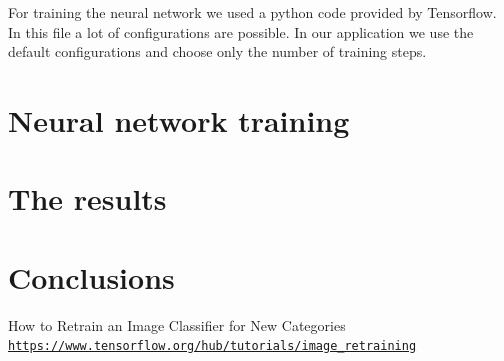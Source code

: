 \documentclass[12pt]{article}
\begin{document}
For training the neural network we used a python code \cite{retrain} provided by
Tensorflow. In this file a lot of configurations are possible. In our 
application we use the default configurations and choose only the number of 
training steps.

\section{Neural network training}

\section{The results}

\section{Conclusions}

\begin{thebibliography}{9}
How to Retrain an Image Classifier for New Categories 
\texttt{\hyperlink{How to Retrain an Image Classifier for New 
Categories}{https://www.tensorflow.org/hub/tutorials/image\_retraining}}

\end{thebibliography}
\end{document}
